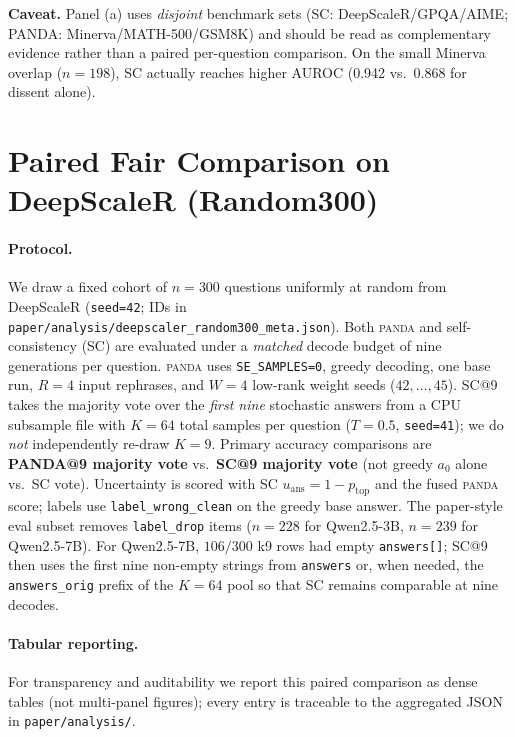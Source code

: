\documentclass{article} %
\DeclareRobustCommand{\method}{%
  \texorpdfstring{%
    \ifmmode\text{\normalfont\textsc{panda}}\else\textsc{panda}\xspace\fi
  }{PANDA}%
}
\begin{document}
\noindent\textbf{Caveat.} Panel (a) uses \emph{disjoint} benchmark sets (SC: DeepScaleR/GPQA/AIME; PANDA: Minerva/MATH-500/GSM8K) and should be read as complementary evidence rather than a paired per-question comparison.
On the small Minerva overlap ($n{=}198$), SC actually reaches higher AUROC (0.942 vs.\ 0.868 for dissent alone).



\section{Paired Fair Comparison on DeepScaleR (Random300)}
\label{app:random300-fair}

\paragraph{Protocol.}
We draw a fixed cohort of $n{=}300$ questions uniformly at random from DeepScaleR (\texttt{seed=42}; IDs in \texttt{paper/analysis/deepscaler\_random300\_meta.json}).
Both \method{} and self-consistency (SC) are evaluated under a \emph{matched} decode budget of nine generations per question.
\method{} uses \texttt{SE\_SAMPLES=0}, greedy decoding, one base run, $R{=}4$ input rephrases, and $W{=}4$ low-rank weight seeds ($42,\ldots,45$).
SC@9 takes the majority vote over the \emph{first nine} stochastic answers from a CPU subsample file with $K{=}64$ total samples per question ($T{=}0.5$, \texttt{seed=41}); we do \emph{not} independently re-draw $K{=}9$.
Primary accuracy comparisons are \textbf{PANDA@9 majority vote} vs.\ \textbf{SC@9 majority vote} (not greedy $a_0$ alone vs.\ SC vote).
Uncertainty is scored with SC $u_{\mathrm{ans}}=1-p_{\mathrm{top}}$ and the fused \method{} score; labels use \texttt{label\_wrong\_clean} on the greedy base answer.
The paper-style eval subset removes \texttt{label\_drop} items ($n{=}228$ for Qwen2.5-3B, $n{=}239$ for Qwen2.5-7B).
For Qwen2.5-7B, $106/300$ k9 rows had empty \texttt{answers[]}; SC@9 then uses the first nine non-empty strings from \texttt{answers} or, when needed, the \texttt{answers\_orig} prefix of the $K{=}64$ pool so that SC remains comparable at nine decodes.

\paragraph{Tabular reporting.}
For transparency and auditability we report this paired comparison as dense tables (not multi-panel figures); every entry is traceable to the aggregated JSON in \texttt{paper/analysis/}.
\end{document}
